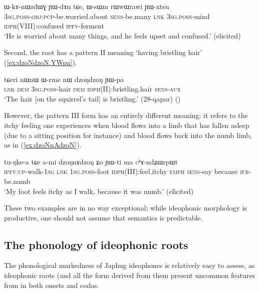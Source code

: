  \begin{exe} 
\ex  \label{ex:rWwWrawi}
\gll  ɯ-kɤ-nɯzdɯɣ ɲɯ-dɤn tɕe, ɯ-sɯm rɯwɯrawi ɲɯ-xtsu  \\
\textsc{3sg}.\textsc{poss}-\textsc{obj}:\textsc{pcp}-be.worried.about \textsc{sens}-be.many \textsc{lnk} \textsc{3sg}.\textsc{poss}-mind \textsc{idph}(VIII):confused \textsc{ipfv}-ferment   \\
\glt `He is worried about many things, and he feels upset and confused.' (elicited)
 \end{exe}
 
Second, the root  has a pattern II  meaning `having bristling hair' (\ref{ex:dzoNdzoN.YWpa}).
 
 \begin{exe} 
\ex  \label{ex:dzoNdzoN.YWpa}
\gll  tɕeri nɯnɯ ɯ-rme nɯ dzoŋdzoŋ ɲɯ-pa\\
\textsc{lnk} \textsc{dem} \textsc{3sg}.\textsc{poss}-hair \textsc{dem} \textsc{idph}(II):bristling.hair \textsc{sens}-\textsc{aux}\\
\glt `The hair [on the squirrel's tail] is bristling.' (28-qapar)
()
 \end{exe}
 
 However, the pattern III form   has an entirely different meaning: it refers to the itchy feeling one experiences when blood flows into a limb that has fallen asleep (due to a sitting position for instance) and blood flows back into the numb limb, as in (\ref{ex:dzoNnAdzoN}).
 
\begin{exe} 
\ex  \label{ex:dzoNnAdzoN}
\gll tu-ŋke-a tɕe a-mi dzoŋnɤdzoŋ ʑo ɲɯ-ti ma cʰɤ-ndʑɯrpɯt  \\
\textsc{ipfv}:\textsc{up}-walk-\textsc{1sg} \textsc{lnk} 1\textsc{sg}.\textsc{poss}-foot \textsc{idph}(III):feel.itchy \textsc{emph} \textsc{sens}-say because \textsc{ifr}-be.numb \\
\glt `My foot feels itchy as I walk, because it was numb.' (elicited)
\end{exe}

These two examples are in no way exceptional; while ideophonic morphology is productive, one should not assume that semantics is predictable.

 \subsection{The phonology of ideophonic roots} \label{sec:ideophonic.roots}
The phonological markedness of Japhug ideophones is relatively easy to assess, as ideophonic roots (and all the form derived from them present uncommon features from in both onsets and codas.

